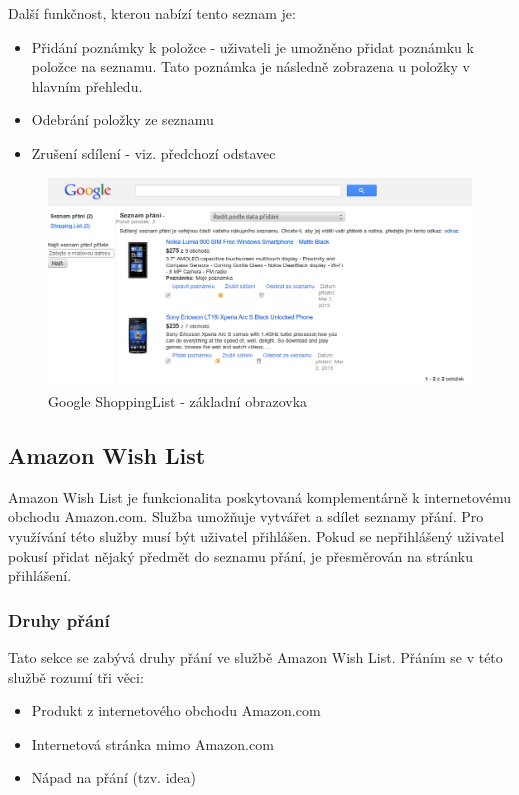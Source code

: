 Další funkčnost, kterou nabízí tento seznam je:
\begin{itemize}
\item Přidání poznámky k položce - uživateli je umožněno přidat poznámku k položce na seznamu.  Tato poznámka je následně zobrazena u položky v hlavním přehledu.
\item Odebrání položky ze seznamu
\item Zrušení sdílení - viz. předchozí odstavec
\end{itemize}

\begin{figure}[htb]
\begin{center}
\includegraphics[width=120mm]{./pictures/google-shopping-list.png}
\caption{Google ShoppingList - základní obrazovka}
\label{fig:google-shoppinglist}
\end{center}
\end{figure}

\subsection{Amazon Wish List}
Amazon Wish List je funkcionalita poskytovaná komplementárně k internetovému obchodu Amazon.com. Služba umožňuje vytvářet a sdílet seznamy přání. Pro využívání této služby musí být uživatel přihlášen. Pokud se nepřihlášený uživatel pokusí přidat nějaký předmět do seznamu přání, je přesměrován na stránku přihlášení.

\subsubsection{Druhy přání}
Tato sekce se zabývá druhy přání ve službě Amazon Wish List. Přáním se v této službě rozumí tři věci:
\begin{itemize}
\item Produkt z internetového obchodu Amazon.com
\item Internetová stránka mimo Amazon.com
\item Nápad na přání (tzv. idea)
\end{itemize}

